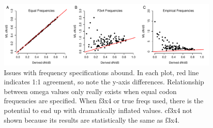 \documentclass[11pt]{article}
\begin{document}
\bigskip
\begin{figure}[H]
\centerline{\includegraphics[width=6in]{figures/regression_fspec_kappatrue.pdf}}
\caption{\label{reg_fspec} Issues with frequency specifications abound. In each plot, red line indicates 1:1 agreement, so note the y-axis differences. Relationship between omega values only really exists when equal codon frequencies are specified. When f3x4 or true freqs used, there is the potential to end up with dramatically inflated values. cf3x4 not shown because its results are statistically the same as f3x4.}
\end{figure}
	
\end{document}

